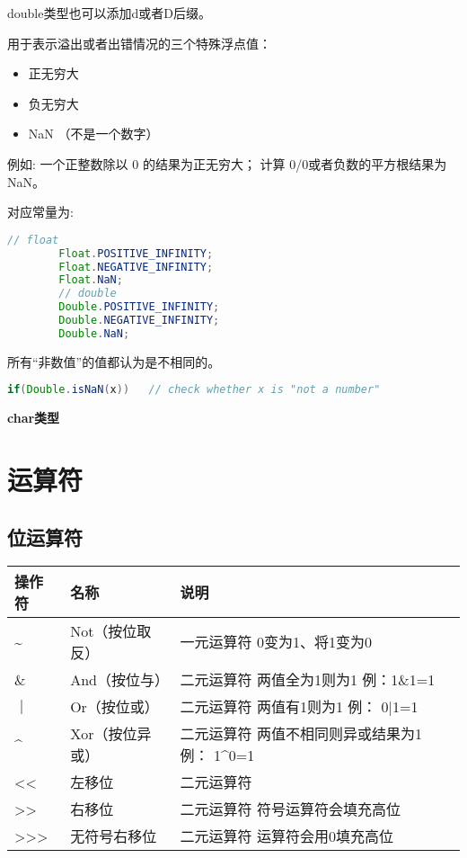 double类型也可以添加d或者D后缀。


用于表示溢出或者出错情况的三个特殊浮点值：

\begin{itemize}
        \item   正无穷大  
        \item   负无穷大
        \item   NaN （不是一个数字）
\end{itemize}

例如: 一个正整数除以 0 的结果为正无穷大； 计算 0/0或者负数的平方根结果为NaN。

对应常量为:
\begin{lstlisting}[language=java]
        // float
        Float.POSITIVE_INFINITY;
        Float.NEGATIVE_INFINITY;
        Float.NaN;
        // double
        Double.POSITIVE_INFINITY;
        Double.NEGATIVE_INFINITY;
        Double.NaN;
\end{lstlisting}


所有“非数值”的值都认为是不相同的。

\begin{lstlisting}[language=java]
        if(Double.isNaN(x))   // check whether x is "not a number"
\end{lstlisting}




\textbf{char类型}


\section{运算符}

\subsection{位运算符}

\renewcommand\arraystretch{2}
\begin{tabular}{l|l|l}
    操作符    &     名称          &     说明                                                   \\   \hline
    \~{}     &  Not（按位取反）   & 一元运算符   \quad 0变为1、将1变为0                            \\
    \&       &   And（按位与）    & 二元运算符 \quad 两值全为1则为1 \quad 例：1\&1=1                \\
    ｜       &   Or（按位或）     & 二元运算符 \quad 两值有1则为1 \quad 例： 0|1=1                  \\
    \^{}     &   Xor（按位异或）  & 二元运算符 \quad 两值不相同则异或结果为1 \quad 例： 1\^{}0=1      \\
    <<       &  左移位           & 二元运算符 \quad                                              \\
    >>       &  右移位           & 二元运算符 \quad 符号运算符会填充高位                                \\ 
    >>>      & 无符号右移位       & 二元运算符 \quad 运算符会用0填充高位                             \\
\end{tabular}\newline


